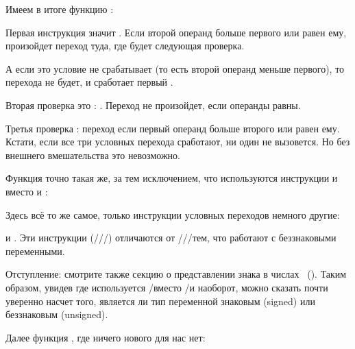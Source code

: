

Имеем в итоге функцию :



Первая инструкция \JLE значит . 
Если второй операнд больше первого или равен ему, произойдет переход туда, где будет следующая проверка.

А если это условие не срабатывает (то есть второй операнд меньше первого), то перехода не будет, 
и сработает первый \printf.

Вторая проверка это \JNE: .
Переход не произойдет, если операнды равны.

Третья проверка \JGE: \EMDASH{}переход 
если первый операнд больше второго или равен ему.
Кстати, если все три условных перехода сработают, ни один \printf не вызовется. 
Но без внешнего вмешательства это невозможно.

Функция  точно такая же, за тем исключением, что используются инструкции 
\JBE и \JAE вместо \JLE и \JGE:



Здесь всё то же самое, только инструкции условных переходов немного другие:

\JBE\EMDASH{} и \JAE\EMDASH{}.
Эти инструкции (\JA/\JAE/\JB/\JBE) 
отличаются от \JG/\JGE/\JL/\JLE тем, что работают с беззнаковыми переменными.

Отступление: смотрите также секцию о представлении знака в числах ~().
Таким образом, увидев где используется \JG/\JL вместо \JA/\JB и наоборот, 
можно сказать почти уверенно насчет того, 
является ли тип переменной знаковым (signed) или беззнаковым (unsigned).

Далее функция \main, где ничего нового для нас нет:



